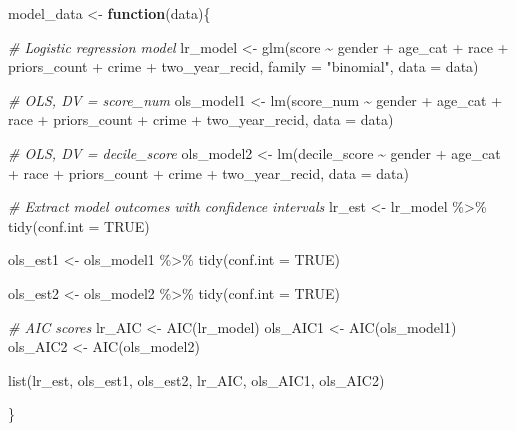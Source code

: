 \documentclass[
]{book}
\newenvironment{Shaded}{\begin{snugshade}}{\end{snugshade}}
\newcommand{\AttributeTok}[1]{\textcolor[rgb]{0.77,0.63,0.00}{#1}}
\newcommand{\CommentTok}[1]{\textcolor[rgb]{0.56,0.35,0.01}{\textit{#1}}}
\newcommand{\ConstantTok}[1]{\textcolor[rgb]{0.00,0.00,0.00}{#1}}
\newcommand{\ControlFlowTok}[1]{\textcolor[rgb]{0.13,0.29,0.53}{\textbf{#1}}}
\newcommand{\FunctionTok}[1]{\textcolor[rgb]{0.00,0.00,0.00}{#1}}
\newcommand{\NormalTok}[1]{#1}
\newcommand{\OtherTok}[1]{\textcolor[rgb]{0.56,0.35,0.01}{#1}}
\newcommand{\SpecialCharTok}[1]{\textcolor[rgb]{0.00,0.00,0.00}{#1}}
\newcommand{\StringTok}[1]{\textcolor[rgb]{0.31,0.60,0.02}{#1}}
\begin{document}
\begin{Shaded}
\begin{Highlighting}[]
\NormalTok{model\_data }\OtherTok{\textless{}{-}} \ControlFlowTok{function}\NormalTok{(data)\{}

\CommentTok{\# Logistic regression model}
\NormalTok{lr\_model }\OtherTok{\textless{}{-}} \FunctionTok{glm}\NormalTok{(score }\SpecialCharTok{\textasciitilde{}}\NormalTok{ gender }\SpecialCharTok{+}\NormalTok{ age\_cat }\SpecialCharTok{+}\NormalTok{ race }\SpecialCharTok{+}\NormalTok{ priors\_count }\SpecialCharTok{+}\NormalTok{ crime }\SpecialCharTok{+}\NormalTok{ two\_year\_recid, }
             \AttributeTok{family =} \StringTok{"binomial"}\NormalTok{, }\AttributeTok{data =}\NormalTok{ data)}

\CommentTok{\# OLS, DV = score\_num}
\NormalTok{ols\_model1 }\OtherTok{\textless{}{-}} \FunctionTok{lm}\NormalTok{(score\_num }\SpecialCharTok{\textasciitilde{}}\NormalTok{ gender }\SpecialCharTok{+}\NormalTok{ age\_cat }\SpecialCharTok{+}\NormalTok{ race }\SpecialCharTok{+}\NormalTok{ priors\_count }\SpecialCharTok{+}\NormalTok{ crime }\SpecialCharTok{+}\NormalTok{ two\_year\_recid, }\AttributeTok{data =}\NormalTok{ data)}

\CommentTok{\# OLS, DV = decile\_score }
\NormalTok{ols\_model2 }\OtherTok{\textless{}{-}} \FunctionTok{lm}\NormalTok{(decile\_score }\SpecialCharTok{\textasciitilde{}}\NormalTok{ gender }\SpecialCharTok{+}\NormalTok{ age\_cat }\SpecialCharTok{+}\NormalTok{ race }\SpecialCharTok{+}\NormalTok{ priors\_count }\SpecialCharTok{+}\NormalTok{ crime }\SpecialCharTok{+}\NormalTok{ two\_year\_recid, }\AttributeTok{data =}\NormalTok{ data)}

\CommentTok{\# Extract model outcomes with confidence intervals }
\NormalTok{lr\_est }\OtherTok{\textless{}{-}}\NormalTok{ lr\_model }\SpecialCharTok{\%\textgreater{}\%} 
    \FunctionTok{tidy}\NormalTok{(}\AttributeTok{conf.int =} \ConstantTok{TRUE}\NormalTok{) }

\NormalTok{ols\_est1 }\OtherTok{\textless{}{-}}\NormalTok{ ols\_model1 }\SpecialCharTok{\%\textgreater{}\%}
    \FunctionTok{tidy}\NormalTok{(}\AttributeTok{conf.int =} \ConstantTok{TRUE}\NormalTok{) }

\NormalTok{ols\_est2 }\OtherTok{\textless{}{-}}\NormalTok{ ols\_model2 }\SpecialCharTok{\%\textgreater{}\%}
    \FunctionTok{tidy}\NormalTok{(}\AttributeTok{conf.int =} \ConstantTok{TRUE}\NormalTok{) }

\CommentTok{\# AIC scores }
\NormalTok{lr\_AIC }\OtherTok{\textless{}{-}} \FunctionTok{AIC}\NormalTok{(lr\_model)}
\NormalTok{ols\_AIC1 }\OtherTok{\textless{}{-}} \FunctionTok{AIC}\NormalTok{(ols\_model1)}
\NormalTok{ols\_AIC2 }\OtherTok{\textless{}{-}} \FunctionTok{AIC}\NormalTok{(ols\_model2)}
    
\FunctionTok{list}\NormalTok{(lr\_est, ols\_est1, ols\_est2, }
\NormalTok{     lr\_AIC, ols\_AIC1, ols\_AIC2)}

\NormalTok{\}}
\end{Highlighting}
\end{Shaded}
\end{document}
